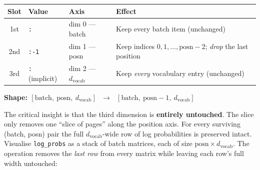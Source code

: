 \documentclass[10pt]{article}
\begin{document}
\begin{center}
\begin{tabular}{clll}
\toprule
\textbf{Slot} & \textbf{Value} & \textbf{Axis} & \textbf{Effect} \\
\midrule
1st & \texttt{:}          & dim 0 --- batch       & Keep every batch item (unchanged) \\
2nd & \texttt{:-1}        & dim 1 --- posn        & Keep indices $0, 1, \ldots, \text{posn}-2$;
                                                     \emph{drop} the last position \\
3rd & \texttt{:} (implicit) & dim 2 --- $d_\text{vocab}$ & Keep \emph{every} vocabulary entry (unchanged) \\
\bottomrule
\end{tabular}
\end{center}

\medskip\noindent
\textbf{Shape: $[\text{batch},\ \text{posn},\ d_\text{vocab}]$
$\;\longrightarrow\;$ $[\text{batch},\ \text{posn}-1,\ d_\text{vocab}]$}

\medskip\noindent
The critical insight is that the third dimension is \textbf{entirely
untouched}. The slice only removes one ``slice of pages'' along the position
axis. For every surviving (batch, posn) pair the full $d_\text{vocab}$-wide
row of log probabilities is preserved intact. Visualise
\texttt{log\_probs} as a stack of $\text{batch}$ matrices, each of size
$\text{posn} \times d_\text{vocab}$. The operation removes the \emph{last
row} from every matrix while leaving each row's full width untouched:
\end{document}
